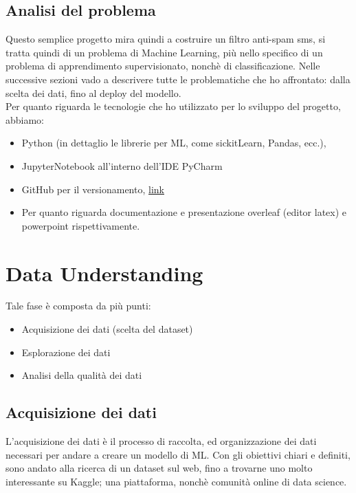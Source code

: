 \documentclass[]{article}
\begin{document}
        \newpage
        \subsection{Analisi del problema}
            Questo semplice progetto mira quindi a costruire un filtro anti-spam sms, si tratta quindi di un problema di Machine Learning, più nello specifico di un problema di apprendimento supervisionato, nonchè di classificazione. Nelle successive sezioni vado a descrivere tutte le problematiche che ho affrontato: dalla scelta dei dati, fino al deploy del modello.\\
            Per quanto riguarda le tecnologie che ho utilizzato per lo sviluppo del progetto, abbiamo:
            \begin{itemize}
                \item Python (in dettaglio le librerie per ML, come sickitLearn, Pandas,  ecc.),
                \item JupyterNotebook all'interno dell'IDE PyCharm
                \item GitHub per il versionamento,  \href{https://github.com/russosamuele/SMSecure.git}{link}
                \item Per quanto riguarda documentazione e presentazione overleaf (editor latex) e powerpoint rispettivamente.
            \end{itemize}
\newpage
\section{Data Understanding}
    Tale fase è composta da più punti:
    \begin{itemize}
        \item Acquisizione dei dati (scelta del dataset)
        \item Esplorazione dei dati
        \item Analisi della qualità dei dati
    \end{itemize}
    \subsection{Acquisizione dei dati}
        L'acquisizione dei dati è il processo di raccolta, ed organizzazione dei dati necessari per andare a creare un modello di ML. Con gli obiettivi chiari e definiti, sono andato alla ricerca di un dataset sul web, fino a trovarne uno molto interessante su Kaggle; una piattaforma, nonchè comunità online di data science. \\
\end{document}
